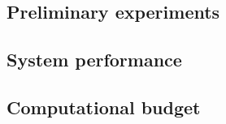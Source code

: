 \subsection{Preliminary experiments}
\subsection{System performance}
\subsection{Computational budget}

